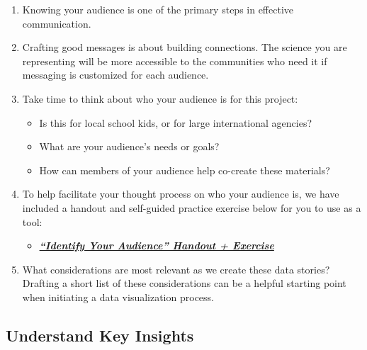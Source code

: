 \documentclass[
]{book}
\providecommand{\tightlist}{%
  \setlength{\itemsep}{0pt}\setlength{\parskip}{0pt}}
\begin{document}
\begin{enumerate}
\def\labelenumi{\arabic{enumi}.}
\tightlist
\item
  Knowing your audience is one of the primary steps in effective communication.
\item
  Crafting good messages is about building connections. The science you are representing will be more accessible to the communities who need it if messaging is customized for each audience.\\
\item
  Take time to think about who your audience is for this project:

  \begin{itemize}
  \tightlist
  \item
    Is this for local school kids, or for large international agencies?
  \item
    What are your audience's needs or goals?
  \item
    How can members of your audience help co-create these materials?
  \end{itemize}
\item
  To help facilitate your thought process on who your audience is, we have included a handout and self-guided practice exercise below for you to use as a tool:

  \begin{itemize}
  \tightlist
  \item
    \href{PDF-Files/M4-S2.Data-Storytelling.Audience-Handout+Exercise.pdf}{\textbf{\emph{``Identify Your Audience'' Handout + Exercise}}}
  \end{itemize}
\item
  What considerations are most relevant as we create these data stories? Drafting a short list of these considerations can be a helpful starting point when initiating a data visualization process.
\end{enumerate}

\hypertarget{understand-key-insights}{%
\subsection{Understand Key Insights}\label{understand-key-insights}}
\end{document}
